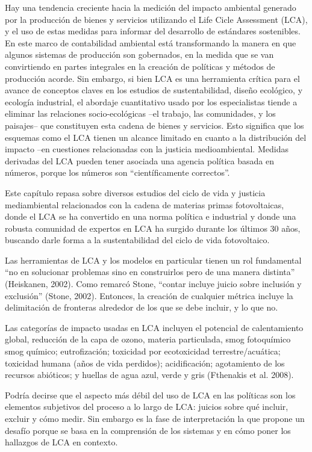 \documentclass[runningheads]{llncs}
\begin{document}
\bigskip
Hay una tendencia creciente hacia la medición del impacto ambiental generado por la producción de bienes y servicios utilizando el Life Cicle Assessment (LCA), y el uso de estas medidas para informar del desarrollo de estándares sostenibles. En este marco de contabilidad ambiental está transformando la manera en que algunos sistemas de producción son gobernados, en la medida que se van convirtiendo en partes integrales en la creación de políticas y métodos de producción acorde. Sin embargo, si bien LCA es una herramienta crítica para el avance de conceptos claves en los estudios de sustentabilidad, diseño ecológico, y ecología industrial, el abordaje cuantitativo usado por los especialistas tiende a eliminar las relaciones socio-ecológicas –el trabajo, las comunidades, y los paisajes– que constituyen esta cadena de bienes y servicios. Esto significa que los esquemas como el LCA  tienen un alcance limitado en cuanto a la distribución del impacto –en cuestiones relacionadas con la justicia medioambiental. Medidas derivadas del LCA pueden tener asociada una agencia política basada en números, porque los números son “científicamente correctos”. 

\bigskip
Este capítulo repasa sobre diversos estudios del ciclo de vida y justicia mediambiental relacionados con la cadena de materias primas fotovoltaicas, donde el LCA se ha convertido en una norma política e industrial y donde una robusta comunidad de expertos en LCA ha surgido durante los últimos 30 años, buscando darle forma a la sustentabilidad del ciclo de vida fotovoltaico. 

\bigskip
Las herramientas de LCA y los modelos en particular tienen un rol fundamental “no en solucionar problemas sino en construirlos pero de una manera distinta” (Heiskanen, 2002). Como remarcó Stone, “contar incluye juicio sobre inclusión y exclusión” (Stone, 2002). Entonces, la creación de cualquier métrica incluye la delimitación de fronteras alrededor de los que se debe incluir, y lo que no. 

\bigskip
Las categorías de impacto usadas en LCA incluyen el potencial de calentamiento global, reducción de la capa de ozono, materia particulada, smog fotoquímico smog químico; eutrofización; toxicidad por ecotoxicidad terrestre/acuática; toxicidad humana (años de vida perdidos); acidificación; agotamiento de los recursos abióticos; y huellas de agua azul, verde y gris (Fthenakis et al. 2008).

\bigskip
Podría decirse que el aspecto más débil del uso de LCA en las políticas son los elementos subjetivos del proceso a lo largo de LCA: juicios sobre qué incluir, excluir y cómo medir. Sin embargo es la fase de interpretación la que propone un desafío porque se basa en la comprensión de los sistemas y en cómo poner los hallazgos de LCA en contexto.
\end{document}
